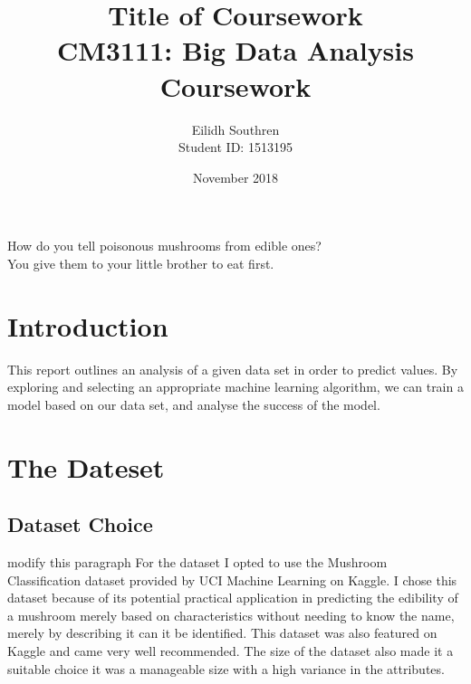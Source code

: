\documentclass[12pt]{article}         %
\title{\Huge Title of Coursework \\[0.5in] \large CM3111: Big Data Analysis Coursework \\[2in]}  %
\author{Eilidh Southren \\[0.25in] Student ID: 1513195\\[3in]}          %
\date{November 2018}
\begin{document}
      
\thispagestyle{empty}%




\maketitle              %
\pagebreak
{}
\vspace*{\fill}


\begin{center}{How do you tell poisonous mushrooms from edible ones?  \\[0.25in]You give them to your little brother to eat first.}\end{center}
\vspace*{\fill}
\pagebreak

\tableofcontents        %

\pagebreak

\section{Introduction}
This report outlines an analysis of a given data set in order to predict values. By exploring and selecting an appropriate machine learning algorithm, we can train a model based on our data set, and analyse the success of the model. 
\newpage

\section{The Dateset}

\subsection{Dataset Choice}
modify this paragraph
For the dataset I opted to use the Mushroom Classification dataset provided by UCI Machine Learning on Kaggle. I chose this dataset because of its potential practical application in predicting the edibility of a mushroom merely based on characteristics without needing to know the name, merely by describing it can it be identified. This dataset was also featured on Kaggle and came very well recommended. The size of the dataset also made it a suitable choice it was a manageable size with a high variance in the attributes.
\end{document}
